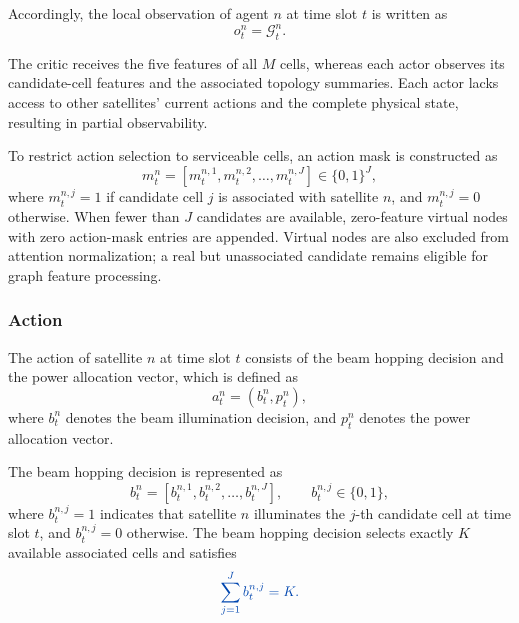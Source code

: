 \documentclass[journal]{IEEEtran}
\newcommand{\revbegin}[1]{\color{revisionblue}\ignorespaces}
\newcommand{\revend}[1]{\color{black}\ignorespaces}
\begin{document}
Accordingly, the local observation of agent $n$ at time slot $t$ is written as
\begin{equation}
o_t^n=\mathcal{G}_t^n.
\end{equation}

\revbegin{}The critic receives the five features of all $M$ cells, whereas each actor observes its candidate-cell features and the associated topology summaries. Each actor lacks access to other satellites' current actions and the complete physical state, resulting in partial observability.\revend{}

To restrict action selection to serviceable cells, an action mask is constructed as
\begin{equation}
m_t^n=[m_t^{n,1},m_t^{n,2},\ldots,m_t^{n,J}]\in\{0,1\}^J,
\end{equation}
\revbegin{}where $m_t^{n,j}=1$ if candidate cell $j$ is associated with satellite $n$, and $m_t^{n,j}=0$ otherwise. When fewer than $J$ candidates are available, zero-feature virtual nodes with zero action-mask entries are appended. Virtual nodes are also excluded from attention normalization; a real but unassociated candidate remains eligible for graph feature processing.\revend{}

\subsubsection{Action}

The action of satellite $n$ at time slot $t$ consists of the beam hopping decision and the power allocation vector, which is defined as
\begin{equation}
a_t^n=(b_t^n,p_t^n),
\label{eq:mappo-action}
\end{equation}
where $b_t^n$ denotes the beam illumination decision, and $p_t^n$ denotes the power allocation vector.

The beam hopping decision is represented as
\begin{equation}
b_t^n=[b_t^{n,1},b_t^{n,2},\ldots,b_t^{n,J}],\qquad b_t^{n,j}\in\{0,1\},
\end{equation}
\revbegin{}where $b_t^{n,j}=1$ indicates that satellite $n$ illuminates the $j$-th candidate cell at time slot $t$, and $b_t^{n,j}=0$ otherwise. The beam hopping decision selects exactly $K$ available associated cells and satisfies\revend{}
\begin{equation}\color{revisionblue}
\sum_{j=1}^{J} b_t^{n,j}=K.
\end{equation}
\end{document}
